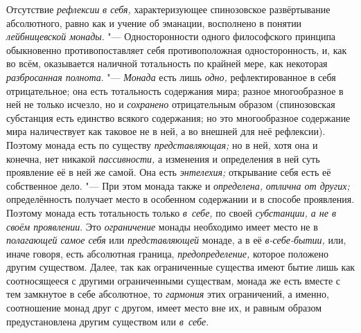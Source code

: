 Отсутствие {\em рефлексии} {\em в
себя,} характеризующее спинозовское развёртывание абсолютного, равно как и
учение об эманации, восполнено в понятии
{\em лейбницевской монады}. "--- Односторонности одного
философского принципа обыкновенно противопоставляет себя противоположная
односторонность, и, как во всём, оказывается наличной тотальность по
крайней мере, как некоторая {\em разбросанная
полнота}. "--- {\em Монада} есть лишь
{\em одно,} рефлектированное в себя отрицательное; она
есть тотальность содержания мира; разное многообразное в ней не только
исчезло, но и {\em сохранено} отрицательным образом
(спинозовская субстанция есть единство всякого содержания; но это
многообразное содержание мира наличествует как таковое не в ней, а во
внешней для неё рефлексии). Поэтому монада есть по существу
{\em представляющая;} но в ней, хотя она и конечна, нет
никакой {\em пассивности,} а изменения и определения в
ней суть проявление её в ней же самой. Она есть
{\em энтелехия;} открывание себя есть её собственное
дело. "--- При этом монада также и {\em определена,}
{\em отлична от других;} определённость получает место
в особенном содержании и в способе проявления. Поэтому монада есть
тотальность только {\em в~себе,} по своей
{\em субстанции, а не в своём проявлении}. Это
{\em ограничение} монады необходимо имеет место не в
{\em полагающей самое себя} или
{\em представляющей} монаде, а в её
{\em в-себе-бытии,} или, иначе говоря, есть абсолютная
граница, {\em предопределение,} которое положено
другим существом. Далее, так как ограниченные существа имеют бытие лишь как
соотносящееся с другими ограниченными существам, монада же есть вместе с
тем замкнутое в себе абсолютное, то {\em гармония} этих
ограничений, а именно, соотношение монад друг с другом, имеет место вне их,
и равным образом предустановлена другим существом или
{\em в~себе}.

